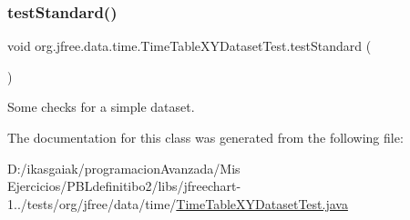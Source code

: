\subsubsection{\texorpdfstring{test\+Standard()}{testStandard()}}
{\footnotesize\ttfamily void org.\+jfree.\+data.\+time.\+Time\+Table\+X\+Y\+Dataset\+Test.\+test\+Standard (\begin{DoxyParamCaption}{ }\end{DoxyParamCaption})}

Some checks for a simple dataset. 

The documentation for this class was generated from the following file\+:\begin{DoxyCompactItemize}
\item 
D\+:/ikasgaiak/programacion\+Avanzada/\+Mis Ejercicios/\+P\+B\+Ldefinitibo2/libs/jfreechart-\/1../tests/org/jfree/data/time/\mbox{\hyperlink{_time_table_x_y_dataset_test_8java}{Time\+Table\+X\+Y\+Dataset\+Test.\+java}}\end{DoxyCompactItemize}
